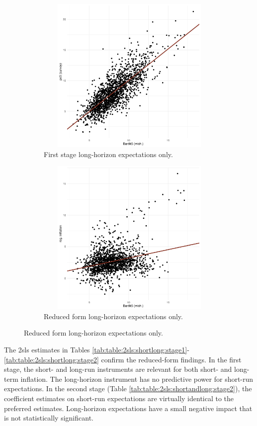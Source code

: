 \documentclass[12pt]{article}
\begin{document}
\begin{figure}
\centering
\caption{Long-run inflation expectations: reduced-form estimates.}\label{fig:5year:redform}
\begin{subfigure}[t]{0.75\textwidth}
\centering
\includegraphics[width = 5in, height =3in]{figs/firstStage5only}
%
\caption{First stage long-horizon expectations only. }\label{5yearsubfig:shares:group}
\end{subfigure}
\vfill
\begin{subfigure}[t]{0.75\textwidth}
\centering
\includegraphics[width =5in, height =3in]{figs/redform5only}
%
\caption{Reduced form long-horizon expectations only.}\label{5yearsubfig:shares:cps}
\end{subfigure}
\end{figure}

The 2sls estimates in Tables \ref{tab:table:2sls:shortlong:stage1}-\ref{tab:table:2sls:shortlong:stage2} confirm the reduced-form findings. In the first stage, the short- and long-run instruments are relevant for both short- and long-term inflation. The long-horizon instrument has no predictive power for short-run expectations. In the second stage (Table \ref{tab:table:2sls:shortandlong:stage2}), the coefficient estimates on short-run expectations are virtually identical to the preferred estimates. Long-horizon expectations have a small negative impact that is not statistically significant.  
\end{document}
